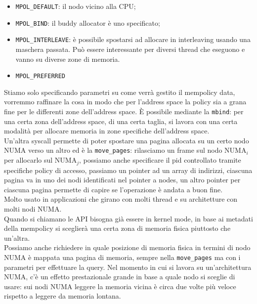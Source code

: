 \documentclass[12pt, oneside]{extbook}
\begin{document}
\begin{itemize}
\item \texttt{MPOL\_DEFAULT}: il nodo vicino alla CPU;
\item \texttt{MPOL\_BIND}: il buddy allocator è uno specificato;
\item \texttt{MPOL\_INTERLEAVE}: è possibile spostarsi ad allocare in interleaving usando una maschera passata. Può essere interessante per diversi thread che eseguono e vanno su diverse zone di memoria.
\item \texttt{MPOL\_PREFERRED}
\end{itemize}
Stiamo solo specificando parametri su come verrà gestito il mempolicy data, vorremmo raffinare la cosa in modo che per l'address space la policy sia a grana fine per le differenti zone dell'address space. È possibile mediante la \texttt{mbind}: per una certa zona dell'address space, di una certa taglia, si lavora con una certa modalità per allocare memoria in zone specifiche dell'address space.\\ Un'altra syscall permette di poter spostare una pagina allocata su un certo nodo NUMA verso un altro ed è la \texttt{move\_pages}: rilasciamo un frame sul nodo NUMA$_i$ per allocarlo sul NUMA$_j$, possiamo anche specificare il pid controllato tramite specifiche policy di accesso, passiamo un pointer ad un array di indirizzi, ciascuna pagina va in uno dei nodi identificati nel pointer a nodes, un altro pointer per ciascuna pagina permette di capire se l'operazione è andata a buon fine.\\ Molto usato in applicazioni che girano con molti thread e su architetture con molti nodi NUMA.\\
Quando si chiamano le API bisogna già essere in kernel mode, in base ai metadati della mempolicy si sceglierà una certa zona di memoria fisica piuttosto che un'altra.\\ Possiamo anche richiedere in quale posizione di memoria fisica in termini di nodo NUMA è mappata una pagina di memoria, sempre nella \texttt{move\_pages} ma con i parametri per effettuare la query. Nel momento in cui si lavora su un'architettura NUMA, c'è un effetto prestazionale grande in base a quale nodo si sceglie di usare: sui nodi NUMA leggere la memoria vicina è circa due volte più veloce rispetto a leggere da memoria lontana.
\end{document}
